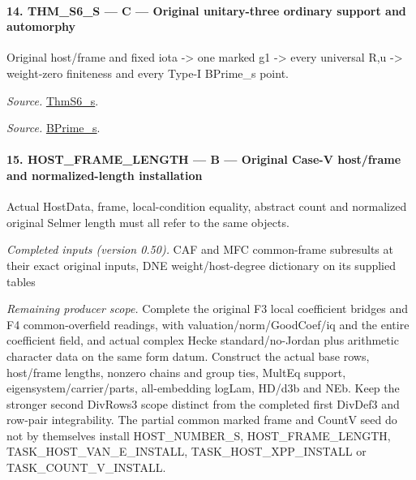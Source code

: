 \documentclass[11pt,a4paper]{article}
\numberwithin{equation}{section}
\theoremstyle{remark}\newtheorem{remark}[theorem]{Remark}
\begin{document}
\paragraph{14. THM\_\allowbreak S6\_\allowbreak S — C — Original unitary-three ordinary support and automorphy}

Original host/frame and fixed iota -> one marked g1 -> every universal R,u -> weight-zero finiteness and every Type-I BPrime\_\allowbreak s point.

\emph{Source.} \href{https://github.com/CocoSgt/riemann-hypothesis-lean/blob/7cbf7a0c32fca1badf05931879a37c3f8a2b03b4/src/Development/AutomorphicArithmetic/AutomorphicVarieties/ModularityArgument/ThresholdArguments/DenseThresholdCases/ThmS6CoreS.lean#L17-L26}{ThmS6\_\allowbreak s}.

\emph{Source.} \href{https://github.com/CocoSgt/riemann-hypothesis-lean/blob/7cbf7a0c32fca1badf05931879a37c3f8a2b03b4/src/Development/AutomorphicArithmetic/AutomorphicVarieties/ModularityArgument/ThresholdArguments/DenseThresholdCases/ThmS6CoreS.lean#L12-L16}{BPrime\_\allowbreak s}.



\paragraph{15. HOST\_\allowbreak FRAME\_\allowbreak LENGTH — B — Original Case-V host/frame and normalized-length installation}

Actual HostData, frame, local-condition equality, abstract count and normalized original Selmer length must all refer to the same objects.

\emph{Completed inputs (version 0.50).} CAF and MFC common-frame subresults at their exact original inputs, DNE weight/host-degree dictionary on its supplied tables

\emph{Remaining producer scope.} Complete the original F3 local coefficient bridges and F4 common-overfield readings, with valuation/norm/GoodCoef/iq and the entire coefficient field, and actual complex Hecke standard/no-Jordan plus arithmetic character data on the same form datum. Construct the actual base rows, host/frame lengths, nonzero chains and group ties, MultEq support, eigensystem/carrier/parts, all-embedding logLam, HD/d3b and NEb. Keep the stronger second DivRows3 scope distinct from the completed first DivDef3 and row-pair integrability. The partial common marked frame and CountV seed do not by themselves install HOST\_\allowbreak NUMBER\_\allowbreak S, HOST\_\allowbreak FRAME\_\allowbreak LENGTH, TASK\_\allowbreak HOST\_\allowbreak VAN\_\allowbreak E\_\allowbreak INSTALL, TASK\_\allowbreak HOST\_\allowbreak XPP\_\allowbreak INSTALL or TASK\_\allowbreak COUNT\_\allowbreak V\_\allowbreak INSTALL.
\end{document}
